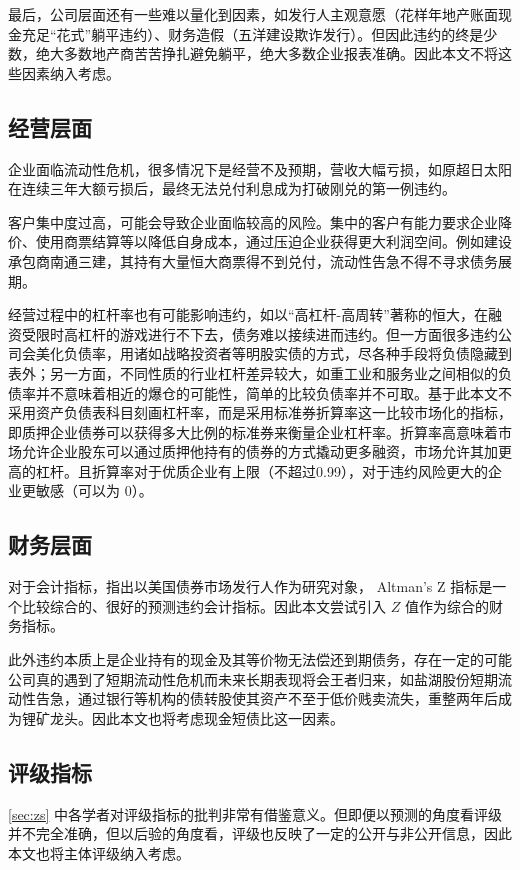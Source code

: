 最后，公司层面还有一些难以量化到因素，如发行人主观意愿（花样年地产账面现金充足“花式”躺平违约）、财务造假（五洋建设欺诈发行）。但因此违约的终是少数，绝大多数地产商苦苦挣扎避免躺平，绝大多数企业报表准确。因此本文不将这些因素纳入考虑。
\subsection{经营层面}
企业面临流动性危机，很多情况下是经营不及预期，营收大幅亏损，如原超日太阳在连续三年大额亏损后，最终无法兑付利息成为打破刚兑的第一例违约。

客户集中度过高，可能会导致企业面临较高的风险\cite{王雄元2017客户集中度与公司债二级市场信用利差}。集中的客户有能力要求企业降价、使用商票结算等以降低自身成本，通过压迫企业获得更大利润空间。例如建设承包商南通三建，其持有大量恒大商票得不到兑付，流动性告急不得不寻求债务展期。

经营过程中的杠杆率也有可能影响违约\cite{王永钦2019杠杆率如何影响资产价格}，如以“高杠杆-高周转”著称的恒大，在融资受限时高杠杆的游戏进行不下去，债务难以接续进而违约。但一方面很多违约公司会美化负债率，用诸如战略投资者等明股实债的方式，尽各种手段将负债隐藏到表外；另一方面，不同性质的行业杠杆差异较大，如重工业和服务业之间相似的负债率并不意味着相近的爆仓的可能性，简单的比较负债率并不可取。基于此本文不采用资产负债表科目刻画杠杆率，而是采用标准券折算率这一比较市场化的指标，即质押企业债券可以获得多大比例的标准券来衡量企业杠杆率。折算率高意味着市场允许企业股东可以通过质押他持有的债券的方式撬动更多融资，市场允许其加更高的杠杆。且折算率对于优质企业有上限（不超过0.99），对于违约风险更大的企业更敏感（可以为 0）。

\subsection{财务层面}
对于会计指标，\Textcite{blochlinger2018ratings}指出以美国债券市场发行人作为研究对象， Altman's Z 指标是一个比较综合的、很好的预测违约会计指标。因此本文尝试引入 \(Z\) 值作为综合的财务指标。

此外违约本质上是企业持有的现金及其等价物无法偿还到期债务，存在一定的可能公司真的遇到了短期流动性危机而未来长期表现将会王者归来，如盐湖股份短期流动性告急，通过银行等机构的债转股使其资产不至于低价贱卖流失，重整两年后成为锂矿龙头。因此本文也将考虑现金短债比这一因素。
\subsection{评级指标}
\ref{sec:zs} 中各学者对评级指标的批判非常有借鉴意义。但即便以预测的角度看评级并不完全准确，但以后验的角度看，评级也反映了一定的公开与非公开信息，因此本文也将主体评级纳入考虑。
